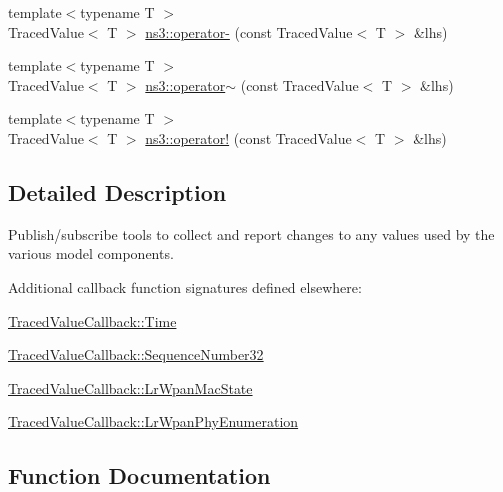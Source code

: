 \begin{DoxyCompactItemize}
\item 
{\footnotesize template$<$typename T $>$ }\\Traced\+Value$<$ T $>$ \hyperlink{group__tracing_ga38cdeb25463f71e678f5250e9e29f282}{ns3\+::operator-\/} (const Traced\+Value$<$ T $>$ \&lhs)
\item 
{\footnotesize template$<$typename T $>$ }\\Traced\+Value$<$ T $>$ \hyperlink{group__tracing_ga1ff2ce12f37dc6033808bb3530fd800e}{ns3\+::operator$\sim$} (const Traced\+Value$<$ T $>$ \&lhs)
\item 
{\footnotesize template$<$typename T $>$ }\\Traced\+Value$<$ T $>$ \hyperlink{group__tracing_ga550cfadaeb4fbbc8ff8f62d011555f07}{ns3\+::operator!} (const Traced\+Value$<$ T $>$ \&lhs)
\end{DoxyCompactItemize}


\subsection{Detailed Description}
Publish/subscribe tools to collect and report changes to any values used by the various model components. 

Additional callback function signatures defined elsewhere\+:
\begin{DoxyItemize}
\item \hyperlink{namespacens3_1_1TracedValueCallback_a7ffd3e7c142ffe7c8a1d2db9b8de38ec}{Traced\+Value\+Callback\+::\+Time}
\item \hyperlink{group__network_ga27972028fff053ee0921314701d0df61}{Traced\+Value\+Callback\+::\+Sequence\+Number32}
\item \hyperlink{group__lr-wpan_gab113a3a2c9eb8193a72835890954f1db}{Traced\+Value\+Callback\+::\+Lr\+Wpan\+Mac\+State}
\item \hyperlink{group__lr-wpan_ga83e29cd3a6a828f93f66faedbd978113}{Traced\+Value\+Callback\+::\+Lr\+Wpan\+Phy\+Enumeration} 
\end{DoxyItemize}

\subsection{Function Documentation}
